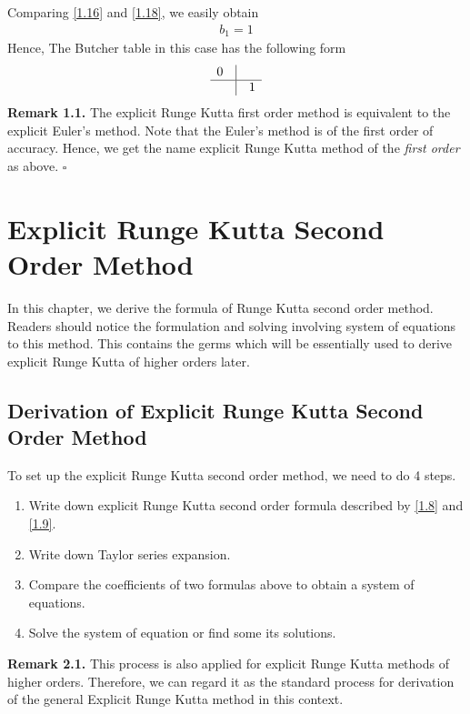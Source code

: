 \documentclass[a4paper,oneside]{book}
\numberwithin{equation}{chapter}
\begin{document}
Comparing \eqref{1.16} and \eqref{1.18}, we easily obtain 
\begin{align}
b_1=1
\end{align}
Hence, The Butcher table in this case has the following form
\begin{align}
\begin{array}{*{20}{c}}
0&\vline& {}\\
\hline
{}&\vline& 1
\end{array}
\end{align}
\textbf{Remark 1.1.} The explicit Runge Kutta first order method is equivalent to the explicit Euler's method. Note that the Euler's method is of the first order of accuracy. Hence, we get the name explicit Runge Kutta method of the \textit{first order} as above.  \hfill $\square$
\chapter{Explicit Runge Kutta Second Order Method}
In this chapter, we derive the formula of Runge Kutta second order method. Readers should notice the formulation and solving involving system of equations to this method. This contains the germs which will be essentially used to derive explicit Runge Kutta of higher orders later.
\section{Derivation of Explicit Runge Kutta Second Order Method}
To set up the explicit Runge Kutta second order method, we need to do 4 steps.
\begin{enumerate}
\item Write down explicit Runge Kutta second order formula described by \eqref{1.8} and \eqref{1.9}.
\item Write down Taylor series expansion.
\item Compare the coefficients of two formulas above to obtain a system of equations. 
\item Solve the system of equation or find some its solutions.
\end{enumerate}
\textbf{Remark 2.1.} This process is also applied for explicit Runge Kutta methods of higher orders. Therefore, we can regard it as the standard process for derivation of the general Explicit Runge Kutta method in this context.\\
\end{document}
